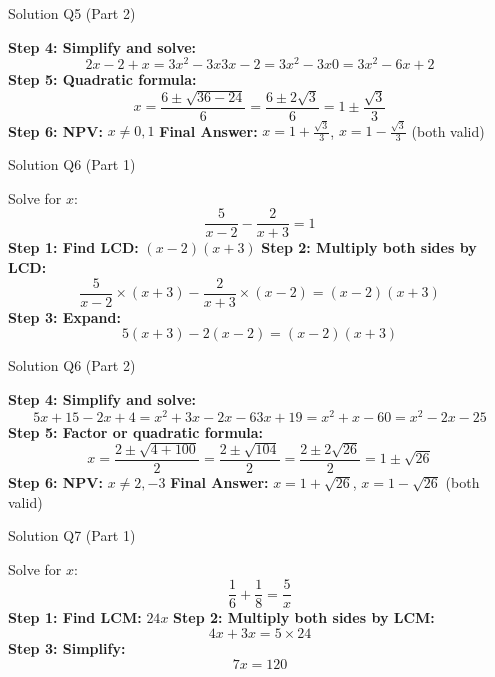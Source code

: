 \documentclass[aspectratio=169]{beamer}
\begin{document}
\begin{frame}{Solution Q5 (Part 2)}
\begin{tcolorbox}[colback=lightgray,colframe=accent,title=Solution Q5 (Part 2)]
\footnotesize
\textbf{Step 4: Simplify and solve:}
\[
2x - 2 + x = 3x^2 - 3x
3x - 2 = 3x^2 - 3x
0 = 3x^2 - 6x + 2
\]
\textbf{Step 5: Quadratic formula:}
\[
x = \frac{6 \pm \sqrt{36 - 24}}{6} = \frac{6 \pm 2\sqrt{3}}{6} = 1 \pm \frac{\sqrt{3}}{3}
\]
\textbf{Step 6: NPV:} $x \neq 0, 1$
\textbf{Final Answer:} $x = 1 + \frac{\sqrt{3}}{3}$, $x = 1 - \frac{\sqrt{3}}{3}$ (both valid)
\end{tcolorbox}
\end{frame}

\begin{frame}{Solution Q6 (Part 1)}
\begin{tcolorbox}[colback=lightgray,colframe=accent,title=Solution Q6 (Part 1)]
\footnotesize
Solve for $x$:
\[
\frac{5}{x-2} - \frac{2}{x+3} = 1
\]
\textbf{Step 1: Find LCD:} $(x-2)(x+3)$
\textbf{Step 2: Multiply both sides by LCD:}
\[
\frac{5}{x-2} \times (x+3) - \frac{2}{x+3} \times (x-2) = (x-2)(x+3)
\]
\textbf{Step 3: Expand:}
\[
5(x+3) - 2(x-2) = (x-2)(x+3)
\]
\end{tcolorbox}
\end{frame}

\begin{frame}{Solution Q6 (Part 2)}
\begin{tcolorbox}[colback=lightgray,colframe=accent,title=Solution Q6 (Part 2)]
\footnotesize
\textbf{Step 4: Simplify and solve:}
\[
5x + 15 - 2x + 4 = x^2 + 3x - 2x - 6
3x + 19 = x^2 + x - 6
0 = x^2 - 2x - 25
\]
\textbf{Step 5: Factor or quadratic formula:}
\[
x = \frac{2 \pm \sqrt{4 + 100}}{2} = \frac{2 \pm \sqrt{104}}{2} = \frac{2 \pm 2\sqrt{26}}{2} = 1 \pm \sqrt{26}
\]
\textbf{Step 6: NPV:} $x \neq 2, -3$
\textbf{Final Answer:} $x = 1 + \sqrt{26}$, $x = 1 - \sqrt{26}$ (both valid)
\end{tcolorbox}
\end{frame}

\begin{frame}{Solution Q7 (Part 1)}
\begin{tcolorbox}[colback=lightgray,colframe=accent,title=Solution Q7 (Part 1)]
\footnotesize
Solve for $x$:
\[
\frac{1}{6} + \frac{1}{8} = \frac{5}{x}
\]
\textbf{Step 1: Find LCM:} $24x$
\textbf{Step 2: Multiply both sides by LCM:}
\[
4x + 3x = 5 \times 24
\]
\textbf{Step 3: Simplify:}
\[
7x = 120
\]
\end{tcolorbox}
\end{frame}
\end{document}
